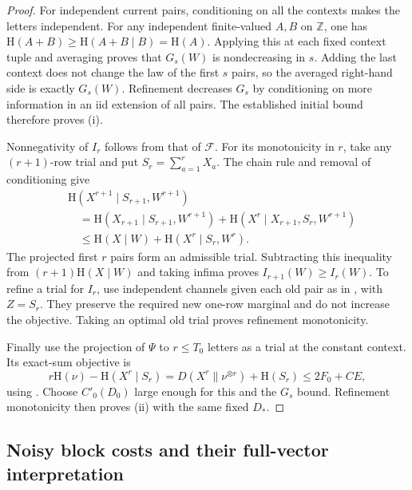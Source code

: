 \begin{proof}
For independent current pairs, conditioning on all the contexts makes
the letters independent.  For any independent finite-valued $A,B$ on
$\mathbb Z$, one has $\mathrm H(A+B)\ge\mathrm H(A+B\mid B)=\mathrm H(A)$.
Applying this at each fixed context tuple and averaging proves that
$G_s(W)$ is nondecreasing in $s$.  Adding the last context does not change
the law of the first $s$ pairs, so the averaged right-hand side is exactly
$G_s(W)$.  Refinement decreases $G_s$ by conditioning on more information
in an iid extension of all pairs.  The established initial bound therefore
proves \textup{(i)}.

Nonnegativity of $I_r$ follows from that of $\mathcal F$.  For its
monotonicity in $r$, take any $(r+1)$-row trial and put
$S_r=\sum_{a=1}^rX_a$.  The chain rule and removal of conditioning give
\begin{align*}
 &\mathrm H(X^{r+1}\mid S_{r+1},W^{r+1})\\
 &\quad=\mathrm H(X_{r+1}\mid S_{r+1},W^{r+1})
    +\mathrm H(X^r\mid X_{r+1},S_r,W^{r+1})\\
 &\quad\le\mathrm H(X\mid W)+\mathrm H(X^r\mid S_r,W^r).
\end{align*}
The projected first $r$ pairs form an admissible trial.  Subtracting this
inequality from $(r+1)\mathrm H(X\mid W)$ and taking infima proves
$I_{r+1}(W)\ge I_r(W)$.  To refine a trial for $I_r$, use independent
channels given each old pair as in
, with $Z=S_r$.  They
preserve the required new one-row marginal and do not increase the
objective.  Taking an optimal old trial proves refinement monotonicity.

Finally use the projection of $\Psi$ to $r\le T_0$ letters as a trial at
the constant context.  Its exact-sum objective is
\[
 r\mathrm H(\nu)-\mathrm H(X^r\mid S_r)
   =D(X^r\|\nu^{\otimes r})+\mathrm H(S_r)
   \le 2F_0+CE,
\]
using .
Choose $C'_0(D_0)$ large enough for this and the $G_s$ bound.  Refinement
monotonicity then proves \textup{(ii)} with the same fixed $D_*$.
\end{proof}

\subsection{Noisy block costs and their full-vector interpretation}

